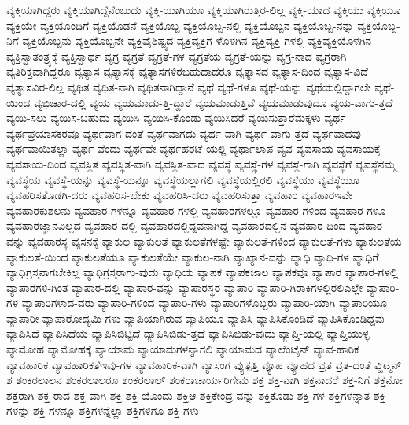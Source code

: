 {ವ್ಯಕ್ತಿಯಾಗಿದ್ದರು
ವ್ಯಕ್ತಿಯಾಗಿದ್ದೆನೆಂಬುದು
ವ್ಯಕ್ತಿ-ಯಾಗಿಯೂ
ವ್ಯಕ್ತಿಯಾಗಿರುತ್ತಿರ-ಲಿಲ್ಲ
ವ್ಯಕ್ತಿ-ಯಾದ
ವ್ಯಕ್ತಿಯು
ವ್ಯಕ್ತಿಯೂ
ವ್ಯಕ್ತಿಯೇ
ವ್ಯಕ್ತಿಯೊಂದಿಗೆ
ವ್ಯಕ್ತಿಯೊಡನೆ
ವ್ಯಕ್ತಿಯೊಬ್ಬ
ವ್ಯಕ್ತಿಯೊಬ್ಬ-ನಲ್ಲಿ
ವ್ಯಕ್ತಿಯೊಬ್ಬನ
ವ್ಯಕ್ತಿಯೊಬ್ಬ-ನನ್ನು
ವ್ಯಕ್ತಿಯೊಬ್ಬ-ನಿಗೆ
ವ್ಯಕ್ತಿಯೊಬ್ಬನು
ವ್ಯಕ್ತಿಯೊಬ್ಬನೇ
ವ್ಯಕ್ತಿವೈಶಿಷ್ಟ್ಯದ
ವ್ಯಕ್ತಿವ್ಯಕ್ತಿಗ-ಳೊಳಗಿನ
ವ್ಯಕ್ತಿವ್ಯಕ್ತಿ-ಗಳಲ್ಲಿ
ವ್ಯಕ್ತಿವ್ಯಕ್ತಿಯೊಳಗಿನ
ವ್ಯಕ್ತಿಸ್ವಾತಂತ್ರ್ಯಕ್ಕೆ
ವ್ಯಕ್ತಿಸ್ವಾರ್ಥ
ವ್ಯಗ್ರ
ವ್ಯಗ್ರತೆ
ವ್ಯಗ್ರತೆ-ಗಳ
ವ್ಯಗ್ರತೆಯ
ವ್ಯಗ್ರತೆ-ಯನ್ನು
ವ್ಯಗ್ರ-ನಾದ
ವ್ಯಗ್ರರಾಗಿ
ವ್ಯತಿರಿಕ್ತವಾಗಿದ್ದರೂ
ವ್ಯತ್ಯಾಸ
ವ್ಯತ್ಯಾಸಕ್ಕೆ
ವ್ಯತ್ಯಾಸಗಳಿರಬಹುದಾದರೂ
ವ್ಯತ್ಯಾಸದ
ವ್ಯತ್ಯಾಸ-ದಿಂದ
ವ್ಯತ್ಯಾಸ-ವಿದೆ
ವ್ಯತ್ಯಾಸವಿರ-ಲಿಲ್ಲ
ವ್ಯಥಿತ
ವ್ಯಥಿತ-ನಾಗಿ
ವ್ಯಥಿತನಾಗಿದ್ದಾನೆ
ವ್ಯಥೆ
ವ್ಯಥೆ-ಗಳೂ
ವ್ಯಥೆ-ಯನ್ನು
ವ್ಯಥೆಯಲ್ಲಿದ್ದಾಗಲೇ
ವ್ಯಥೆ-ಯಿಂದ
ವ್ಯಭಿಚಾರ-ದಲ್ಲಿ
ವ್ಯಯ
ವ್ಯಯಮಾಡು-ತ್ತಿ-ದ್ದಾರೆ
ವ್ಯಯಮಾಡುತ್ತಿವೆ
ವ್ಯಯಮಾಡುವುದೂ
ವ್ಯಯ-ವಾಗು-ತ್ತದೆ
ವ್ಯಯಿ-ಸಲು
ವ್ಯಯಿಸ-ಬಹುದು
ವ್ಯಯಿಸಿ
ವ್ಯಯಿಸಿ-ಕೊಂಡು
ವ್ಯಯಿಸಿದರೆ
ವ್ಯಯಿಸುತ್ತಾರೆಮಕ್ಕಳು
ವ್ಯರ್ಥ
ವ್ಯರ್ಥಪ್ರಯಾಸಕರವೂ
ವ್ಯರ್ಥವಾಗ-ದಂತೆ
ವ್ಯರ್ಥವಾಗದು
ವ್ಯರ್ಥ-ವಾಗಿ
ವ್ಯರ್ಥ-ವಾಗು-ತ್ತದೆ
ವ್ಯರ್ಥವಾದವು
ವ್ಯರ್ಥವಾಯಿತಲ್ಲಾ
ವ್ಯರ್ಥ-ವೆಂದು
ವ್ಯರ್ಥವೇ
ವ್ಯರ್ಥಹರಟೆ-ಯಲ್ಲಿ
ವ್ಯರ್ಥಾಲಾಪ
ವ್ಯವ
ವ್ಯವಸಾಯ
ವ್ಯವಸಾಯಕ್ಕೆ
ವ್ಯವಸಾಯ-ದಿಂದ
ವ್ಯವಸ್ಥಿತ
ವ್ಯವಸ್ಥಿತ-ವಾಗಿ
ವ್ಯವಸ್ಥಿತ-ವಾದ
ವ್ಯವಸ್ಥೆ
ವ್ಯವಸ್ಥೆ-ಗಳ
ವ್ಯವಸ್ಥೆ-ಗಾಗಿ
ವ್ಯವಸ್ಥೆಗೆ
ವ್ಯವಸ್ಥೆನಮ್ಮ
ವ್ಯವಸ್ಥೆಯ
ವ್ಯವಸ್ಥೆ-ಯನ್ನು
ವ್ಯವಸ್ಥೆ-ಯನ್ನೂ
ವ್ಯವಸ್ಥೆಯಲ್ಲಾಗಲಿ
ವ್ಯವಸ್ಥೆಯಲ್ಲಿರಲಿ
ವ್ಯವಸ್ಥೆಯು
ವ್ಯವಸ್ಥೆಯೂ
ವ್ಯವಹರಿಸತೊಡಗಿ-ದರು
ವ್ಯವಹರಿಸ-ಬೇಕು
ವ್ಯವಹರಿಸಿ-ದರು
ವ್ಯವಹರಿಸುತ್ತಾ
ವ್ಯವಹಾರ
ವ್ಯವಹಾರಇವೇ
ವ್ಯವಹಾರಕುಶಲನು
ವ್ಯವಹಾರ-ಗಳನ್ನೂ
ವ್ಯವಹಾರ-ಗಳಲ್ಲಿ
ವ್ಯವಹಾರಗಳಲ್ಲೂ
ವ್ಯವಹಾರ-ಗಳಿಂದ
ವ್ಯವಹಾರ-ಗಳೂ
ವ್ಯವಹಾರಜ್ಞಾನವಿಲ್ಲದ
ವ್ಯವಹಾರ-ದಲ್ಲಿ
ವ್ಯವಹಾರದಲ್ಲಿದ್ದವನಾಗಿದ್ದ
ವ್ಯವಹಾರದಲ್ಲಿನ
ವ್ಯವಹಾರ-ದಿಂದ
ವ್ಯವಹಾರ-ವನ್ನು
ವ್ಯವಹಾರಸ್ಥ
ವ್ಯಸನಕ್ಕೆ
ವ್ಯಾಕುಲ
ವ್ಯಾಕುಲತೆ
ವ್ಯಾಕುಲತೆಗಳಷ್ಟೇ
ವ್ಯಾಕುಲತೆ-ಗಳಿಂದ
ವ್ಯಾಕುಲತೆ-ಗಳು
ವ್ಯಾಕುಲತೆಯ
ವ್ಯಾಕುಲತೆ-ಯಿಂದ
ವ್ಯಾಕುಲತೆಯೂ
ವ್ಯಾಕುಲತೆಯೇ
ವ್ಯಾಕುಲ-ನಾಗಿ
ವ್ಯಾಖ್ಯಾನ-ವನ್ನು
ವ್ಯಾಧಿ
ವ್ಯಾಧಿ-ಗಳ
ವ್ಯಾಧಿಗೆ
ವ್ಯಾಧಿಗ್ರಸ್ತನಾಗಬೇಕಿಲ್ಲ
ವ್ಯಾಧಿಗ್ರಸ್ತರಾಗು-ವುದು
ವ್ಯಾಧಿಯ
ವ್ಯಾಪಕ
ವ್ಯಾಪಕಜಾಲ
ವ್ಯಾಪಕವೂ
ವ್ಯಾಪಾರ
ವ್ಯಾಪಾರ-ಗಳಲ್ಲಿ
ವ್ಯಾಪಾರಗಳಿ-ಗಿಂತ
ವ್ಯಾಪಾರ-ದಲ್ಲಿ
ವ್ಯಾಪಾರ-ವನ್ನು
ವ್ಯಾಪಾರಸ್ಥರ
ವ್ಯಾಪಾರಿ
ವ್ಯಾಪಾರಿ-ಗಿರಾಕಿಗಳಲ್ಲಿರಲಿಎಲ್ಲೇ
ವ್ಯಾಪಾರಿ-ಗಳ
ವ್ಯಾಪಾರಿಗಳಾದ-ವರು
ವ್ಯಾಪಾರಿ-ಗಳಿಂದ
ವ್ಯಾಪಾರಿ-ಗಳು
ವ್ಯಾಪಾರಿಗಳೊಬ್ಬರು
ವ್ಯಾಪಾರಿ-ಯಾಗಿ
ವ್ಯಾಪಾರಿಯೂ
ವ್ಯಾಪಾರೀ
ವ್ಯಾಪಾರೋದ್ಯಮಿ-ಗಳು
ವ್ಯಾಪಿಯಾಗಿರುವ
ವ್ಯಾಪಿಯೂ
ವ್ಯಾಪಿಸಿ
ವ್ಯಾಪಿಸಿಕೊಂಡಿದೆ
ವ್ಯಾಪಿಸಿಕೊಂಡಿದ್ದವು
ವ್ಯಾಪಿಸಿದೆ
ವ್ಯಾಪಿಸಿದೆಯೆ
ವ್ಯಾಪಿಸಿಬಿಟ್ಟಿದೆ
ವ್ಯಾಪಿಸಿಬಿಡು-ತ್ತದೆ
ವ್ಯಾಪಿಸಿಬಿಡು-ವುದು
ವ್ಯಾಪ್ತಿ-ಯಲ್ಲಿ
ವ್ಯಾಪ್ತಿಯುಳ್ಳ
ವ್ಯಾಮೋಹ
ವ್ಯಾಮೋಹಕ್ಕೆ
ವ್ಯಾಯಾಮ
ವ್ಯಾಯಾಮಗಳನ್ನಾಗಲಿ
ವ್ಯಾಯಾಮದ
ವ್ಯಾಲೆಂಟೈನ್
ವ್ಯಾವ-ಹಾರಿಕ
ವ್ಯಾವಹಾರಿಕ
ವ್ಯಾವಹಾರಿಕತೆಇವು-ಗಳ
ವ್ಯಾವಹಾರಿಕ-ವಾಗಿ
ವ್ಯಾಸಂಗ
ವ್ಯುತ್ಪತ್ತಿ
ವ್ಯೂಹ
ವ್ಯೂಹದ
ವ್ರತ
ವ್ರತ-ದಂತೆ
ವ್ಹಿಟ್ಮನ್
ಶ
ಶಂಕರಲಾಲನ
ಶಂಕರಲಾಲರೂ
ಶಂಕರಲಾಲ್
ಶಂಕರಾಚಾರ್ಯರಿಗೇನು
ಶಕ್ತ
ಶಕ್ತ-ನಾಗಿ
ಶಕ್ತನಾದರೆ
ಶಕ್ತ-ನಿಗೆ
ಶಕ್ತನೋ
ಶಕ್ತರಾಗಿ
ಶಕ್ತ-ರಾದ
ಶಕ್ತ-ವಾಗಿ
ಶಕ್ತಿ
ಶಕ್ತಿ-ಯೊಂದು
ಶಕ್ತಿಆ
ಶಕ್ತಿಕೇಂದ್ರ-ವನ್ನು
ಶಕ್ತಿಕೊಡು
ಶಕ್ತಿ-ಗಳ
ಶಕ್ತಿಗಳನ್ನಾತ
ಶಕ್ತಿ-ಗಳನ್ನು
ಶಕ್ತಿ-ಗಳನ್ನೂ
ಶಕ್ತಿಗಳನ್ನೆಲ್ಲಾ
ಶಕ್ತಿಗಳಿಗೂ
ಶಕ್ತಿ-ಗಳು
}
